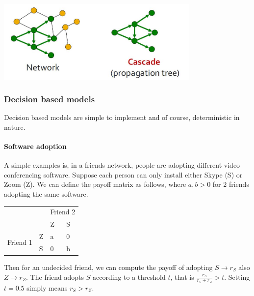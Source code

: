 
{
\centering
\includegraphics[width=0.75\textwidth]{notes/img/l12_p8_cascade.JPG} \par
}

\subsubsection{Decision based models}\label{ss_341_decision_based}

Decision based models are simple to implement and of course, deterministic in nature.

\paragraph{Software adoption} A simple examples is, in a friends network, people are adopting different video conferencing software. Suppose each person can only install either Skype (S) or Zoom (Z). We can define the payoff matrix as follows, where $a, b > 0$ for $2$ friends adopting the same software.

\begin{table}[h]
\centering
\begin{tabular}{ll|ll}
                                              &   & \multicolumn{2}{l}{Friend 2} \\
                                              &   & Z             & S            \\\hline
\multicolumn{1}{c}{\multirow{2}{*}{Friend 1}} & Z & a             & 0            \\
\multicolumn{1}{c}{}                          & S & 0             & b           
\end{tabular}
\end{table}

Then for an undecided friend, we can compute the payoff of adopting $S \rightarrow r_S$ also $Z \rightarrow r_Z$. The friend adopts $S$ according to a threshold $t$, that is $\frac{r_S}{r_S + r_Z} > t$. Setting $t=0.5$ simply means $r_S > r_Z$.

